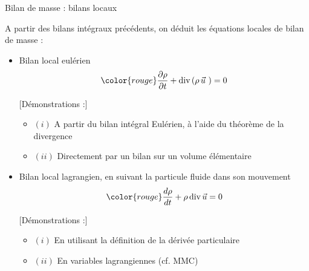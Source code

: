 \begin{frame}{Bilan de masse : bilans locaux}

\small

A partir des bilans intégraux précédents, on déduit les équations locales de bilan de masse :

\medskip

\begin{itemize}

\item
  Bilan local eulérien
	\begin{equation}
			\color{rouge}
		\dpdt{\rho} + \divergence ( \rho \, \myvec{u}\ ) = 0
		\label{eq:bilan_local_eulerien_masse}
	\end{equation}
\medskip

\pause 
\textcolor{vert}{[Démonstrations :]}

\begin{itemize}
	\item $(i)$ A partir du bilan intégral Eulérien, à l'aide du théorème de la divergence
	\item $(ii)$ Directement par un bilan sur un volume élémentaire 
\end{itemize}


\pause

\item
	Bilan local lagrangien, en suivant la particule fluide dans son mouvement
	\begin{equation}
		\color{rouge}
		\ddt{\rho} + \rho \, \divergence \myvec{u} = 0
		\label{eq:bilan_local_lagrangien_masse}
	\end{equation}
\pause

\textcolor{vert}{[Démonstrations :] }
\begin{itemize}
	\item $(i)$ En utilisant la définition de la dérivée particulaire
	\item $(ii)$ En variables lagrangiennes (cf. MMC) 
\end{itemize}


\end{itemize}
\end{frame}


